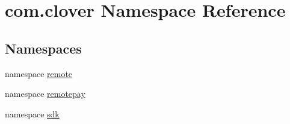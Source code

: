 \hypertarget{namespacecom_1_1clover}{}\section{com.\+clover Namespace Reference}
\label{namespacecom_1_1clover}
\subsection*{Namespaces}
\begin{DoxyCompactItemize}
\item 
namespace \hyperlink{namespacecom_1_1clover_1_1remote}{remote}
\item 
namespace \hyperlink{namespacecom_1_1clover_1_1remotepay}{remotepay}
\item 
namespace \hyperlink{namespacecom_1_1clover_1_1sdk}{sdk}
\end{DoxyCompactItemize}
